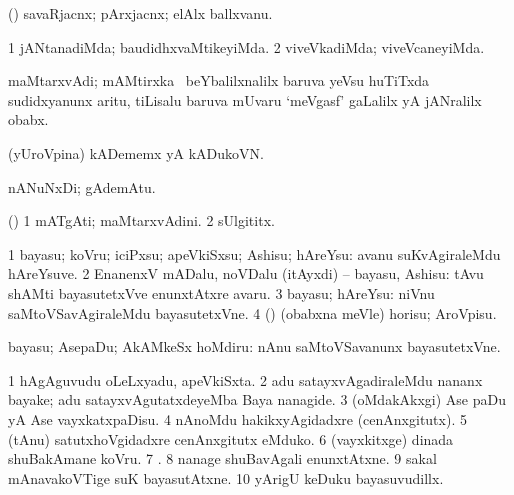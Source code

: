 {{{{{{\bentry
{}
 \gl{\nA}\bmng
(\AmA) savaRjacnx; pArxjacnx; elAlx ballxvanu. 
\emng
\eentry

\bentry
{}
  \gl{\kirxvi}\bmng
\bnum
\num{1} jANtanadiMda; baudidhxvaMtikeyiMda. 
\num{2} viveVkadiMda; viveVcaneyiMda. 
\enum
\emng
\eentry

\bentry
{}
 \gl{\nA}\bmng
maMtarxvAdi; mAMtirxka \eng{[} \kanmu\ beYbalilxnalilx baruva yeVsu huTiTxda sudidxyanunx aritu, tiLisalu baruva mUvaru `meVgasf' gaLalilx yA jANralilx obabx\eng{]}. 
\emng
\eentry

\bentry
{}
  \gl{\nA}\bmng
(yUroVpina) kADememx yA kADukoVN. 
\emng
\eentry

\bentry
{}
 \gl{\nA}\bmng
nANuNxDi; gAdemAtu. 
\emng
\eentry

\bentry
{}
 \gl{\nA}\bmng
(\birx) 
\bnum
\num{1} mATgAti; maMtarxvAdini. 
\num{2} sUlgititx. 
\enum
\emng
\eentry

\bentry
{} 
\gl{\sakirx}
\bmng
\bnum
\num{1} bayasu; koVru; iciPxsu; apeVkiSxsu; Ashisu; hAreYsu:  avanu suKvAgiraleMdu hAreYsuve. 
\num{2} EnanenxV mADalu, noVDalu (itAyxdi) -- bayasu, Ashisu:  tAvu shAMti bayasutetxVve enunxtAtxre avaru. 
\num{3} bayasu; hAreYsu:  niVnu saMtoVSavAgiraleMdu bayasutetxVne. 
\num{4} (\AmA) (obabxna meVle) horisu; AroVpisu. 
\enum
\emng

\noindent 
\gl{\akirx}
\bmng
bayasu; AsepaDu; AkAMkeSx hoMdiru:  nAnu saMtoVSavanunx bayasutetxVne. 
\emng

\noindent 
\gl{\pagu}
\bmng
\bnum
\num{1}  hAgAguvudu oLeLxyadu, apeVkiSxta. 
\num{2} adu satayxvAgadiraleMdu nananx bayake; adu satayxvAgutatxdeyeMba Baya nanagide. 
\num{3}  (oMdakAkxgi) Ase paDu yA Ase vayxkatxpaDisu. 
\num{4}  nAnoMdu hakikxyAgidadxre (cenAnxgitutx). 
\num{5}  (tAnu) satutxhoVgidadxre cenAnxgitutx eMduko. 
\num{6} (vayxkitxge) dinada shuBakAmane koVru. 
\num{7}  . 
\num{8} nanage shuBavAgali enunxtAtxne. 
\num{9}  sakal mAnavakoVTige suK bayasutAtxne. 
\num{10}  yArigU keDuku bayasuvudillx. 
\enum
\emng
\eentry

}}}}}}
